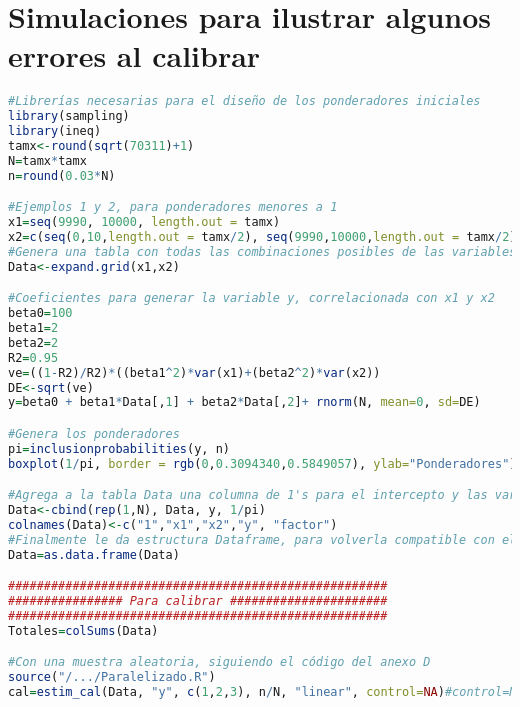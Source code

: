 \documentclass[a4paper,twoside,openright,12pt]{book}
\theoremstyle{definition}
\numberwithin{equation}{chapter}
\numberwithin{figure}{chapter}
\numberwithin{table}{chapter}
\numberwithin{theorem}{chapter}
\numberwithin{lemma}{chapter}
\begin{document}
\chapter{Simulaciones para ilustrar algunos errores al calibrar}\label{anx:A0}%
\begin{lstlisting}[language=R]
#Librerías necesarias para el diseño de los ponderadores iniciales
library(sampling)
library(ineq)
tamx<-round(sqrt(70311)+1)
N=tamx*tamx
n=round(0.03*N)

#Ejemplos 1 y 2, para ponderadores menores a 1
x1=seq(9990, 10000, length.out = tamx)
x2=c(seq(0,10,length.out = tamx/2), seq(9990,10000,length.out = tamx/2))
#Genera una tabla con todas las combinaciones posibles de las variables x1 y x2
Data<-expand.grid(x1,x2)

#Coeficientes para generar la variable y, correlacionada con x1 y x2
beta0=100
beta1=2
beta2=2
R2=0.95
ve=((1-R2)/R2)*((beta1^2)*var(x1)+(beta2^2)*var(x2))
DE<-sqrt(ve)
y=beta0 + beta1*Data[,1] + beta2*Data[,2]+ rnorm(N, mean=0, sd=DE)

#Genera los ponderadores
pi=inclusionprobabilities(y, n)
boxplot(1/pi, border = rgb(0,0.3094340,0.5849057), ylab="Ponderadores")

#Agrega a la tabla Data una columna de 1's para el intercepto y las variables creadas
Data<-cbind(rep(1,N), Data, y, 1/pi)
colnames(Data)<-c("1","x1","x2","y", "factor")
#Finalmente le da estructura Dataframe, para volverla compatible con el código del anexo D
Data=as.data.frame(Data)

#####################################################
################ Para calibrar ######################
#####################################################
Totales=colSums(Data)

#Con una muestra aleatoria, siguiendo el código del anexo D
source("/.../Paralelizado.R")
cal=estim_cal(Data, "y", c(1,2,3), n/N, "linear", control=NA)#control=NA para el ejemplo 1
\end{lstlisting}
\end{document}
